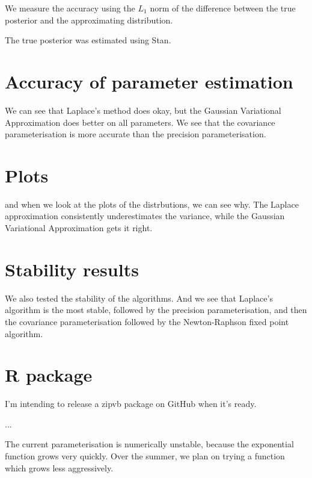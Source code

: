 \documentclass{amsart}
\begin{document}
We measure the accuracy using the $L_1$ norm of the difference between the true posterior and the approximating
distribution.

The true posterior was estimated using Stan.

\section{Accuracy of parameter estimation}

We can see that Laplace's method does okay, but the Gaussian Variational Approximation does better on all
parameters. We see that the covariance parameterisation is more accurate than the precision parameterisation.

\section{Plots}

and when we look at the plots of the distrbutions, we can see why. The Laplace approximation consistently
underestimates the variance, while the Gaussian Variational Approximation gets it right.

\section{Stability results}

We also tested the stability of the algorithms. And we see that Laplace's algorithm is the most stable,
followed by the precision parameterisation, and then the covariance parameterisation followed by the
Newton-Raphson fixed point algorithm.

\section{R package}

I'm intending to release a zipvb package on GitHub when it's ready.

...

The current parameterisation is numerically unstable, because the exponential function grows very quickly.
Over the summer, we plan on trying a function which grows less aggressively.
\end{document}
